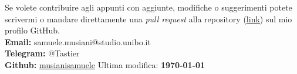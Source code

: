 Se volete contribuire agli appunti con aggiunte, modifiche o suggerimenti potete scrivermi o mandare direttamente una \textit{pull request} alla repository (\href{https://github.com/musianisamuele/Analisi}{link}) sul mio profilo GitHub.\\


\textbf{Email:} samuele.musiani@studio.unibo.it\\

\textbf{Telegram:} @Tastier\\

\textbf{Github:} \href{https://github.com/musianisamuele}{musianisamuele}
\hfill Ultima modifica: \textbf{\today}
